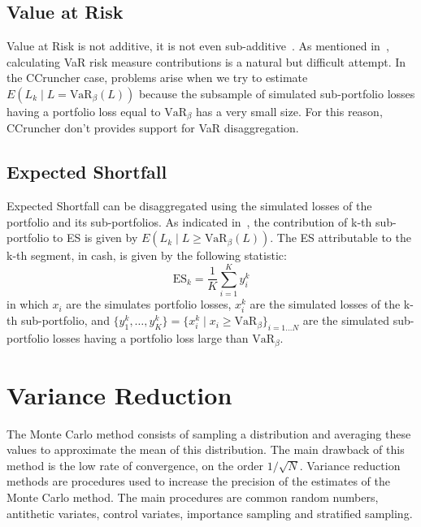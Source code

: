 \documentclass[11pt,fleqn]{book} %
\begin{document}
\subsection{Value at Risk}
Value at Risk is not additive, it is not even sub-additive~\cite{var:varbad}.
As mentioned in~\cite[chap. 5.2.2]{bluhm:2002}, calculating VaR risk 
measure contributions is a natural but difficult attempt. In the CCruncher 
case, problems arise when we try to estimate 
$E\left(L_k \mid L = \text{VaR}_{\beta}(L)\right)$ because the subsample of 
simulated sub-portfolio losses having a portfolio loss equal to 
$\text{VaR}_{\beta}$ has a very small size. For this reason, CCruncher 
don't provides support for VaR disaggregation.

\subsection{Expected Shortfall}
Expected Shortfall can be disaggregated using the simulated losses of the 
portfolio and its sub-portfolios. As indicated 
in~\cite[chap. 5.2.3]{bluhm:2002}, the contribution of k-th sub-portfolio 
to ES is given by $E\left(L_k \mid L \ge \text{VaR}_{\beta}(L)\right)$.
The ES attributable to the k-th segment, in cash, is given by the 
following statistic:
\begin{displaymath}
	\text{ES}_k = \frac{1}{K} \displaystyle \sum_{i=1}^{K} y_i^k
\end{displaymath}
in which $x_i$ are the simulates portfolio losses, $x_i^k$ are the simulated 
losses of the k-th sub-portfolio, and
$\{y_1^k,\dots,y_K^k\} = \{x_i^k \mid x_i \ge \text{VaR}_{\beta}\}_{i=1\dots N}$ 
are the simulated sub-portfolio losses having a portfolio loss large than 
$\text{VaR}_{\beta}$.

\section{Variance Reduction}

The Monte Carlo method consists of sampling a distribution and averaging 
these values to approximate the mean of this distribution. The main drawback 
of this method is the low rate of convergence, on the order $1/\sqrt{N}$.
Variance reduction methods are procedures used to increase the precision 
of the estimates of the Monte Carlo method. The main procedures are common 
random numbers, antithetic variates, control variates, importance sampling 
and stratified sampling.
\end{document}
